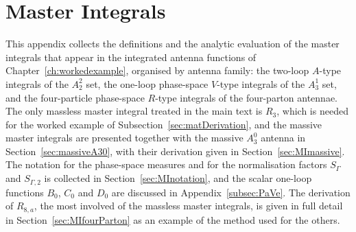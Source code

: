 \chapter{Master Integrals}\label{ap:masterIntegrals}

This appendix collects the definitions and the analytic evaluation of the master integrals that appear
in the integrated antenna functions of Chapter~\ref{ch:workedexample}, organised by antenna family:
the two-loop $A$-type integrals of the $A_2^2$ set, the one-loop phase-space $V$-type integrals of the
$A_3^1$ set, and the four-particle phase-space $R$-type integrals of the four-parton antennae. The
only massless master integral treated in the main text is $R_3$, which is needed for the worked
example of Subsection~\ref{sec:matDerivation}, and the massive master integrals are presented together
with the massive $A_3^0$ antenna in Section~\ref{sec:massiveA30}, with their derivation given in
Section~\ref{sec:MImassive}. The notation for the phase-space
measures and for the normalisation factors $S_\Gamma$ and $S_{\Gamma,2}$ is collected in
Section~\ref{sec:MInotation}, and the scalar one-loop functions $B_0$, $C_0$ and $D_0$
are discussed in Appendix~\ref{subsec:PaVe}. The derivation of $R_{8,a}$, the most involved of the
massless master integrals, is given in full detail in Section~\ref{sec:MIfourParton} as an example of
the method used for the others.

